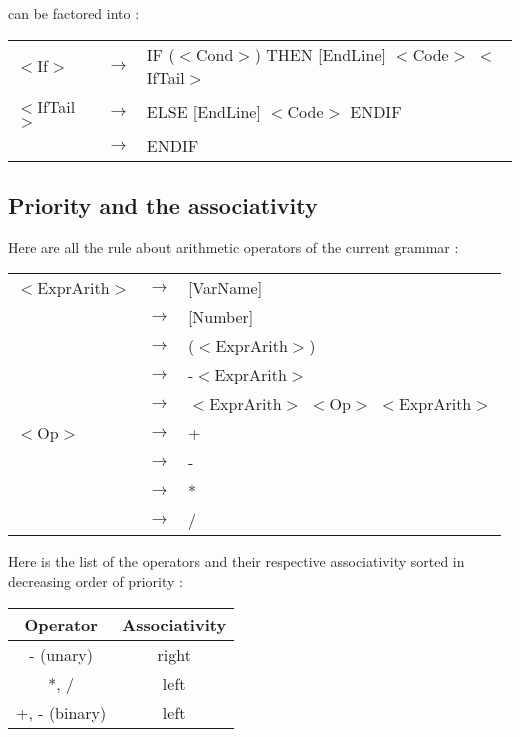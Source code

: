 \documentclass{article}
\begin{document}
\noindent can be factored into :

\begin{center}
\begin{tabular}{|m{1cm} m{0.5cm} m{10cm}|}
\hline
$<$If$>$ & $\to$ & IF ($<$Cond$>$) THEN [EndLine] $<$Code$>$ $<$IfTail$>$\\
$<$IfTail$>$ & $\to$ & ELSE [EndLine] $<$Code$>$ ENDIF\\
& $\to$ & ENDIF\\
\hline
\end{tabular}
\end{center}

\subsection{Priority and the associativity}

\noindent Here are all the rule about arithmetic operators of the current grammar :
\begin{center}
\begin{tabular}{|m{2cm} m{0.5cm} m{6cm}|}
\hline
$<$ExprArith$>$ & $\to$ & [VarName]\\
& $\to$ & [Number]\\
& $\to$ & ($<$ExprArith$>$)\\
& $\to$ & -$<$ExprArith$>$\\
& $\to$ & $<$ExprArith$>$ $<$Op$>$ $<$ExprArith$>$\\

$<$Op$>$ & $\to$ & + \\
& $\to$ & -\\
& $\to$ & *\\
& $\to$ & /\\
\hline
\end{tabular}
\end{center}

\noindent Here is the list of the operators and their respective associativity sorted in decreasing order of priority :
\begin{center}
\begin{tabular}{|c|c|}
\hline
\textbf{Operator} & \textbf{Associativity}\\
\hline\hline
- (unary) & right \\
\hline
*, / & left \\
\hline
+, - (binary) & left \\
\hline
\end{tabular}
\end{center}
\end{document}
